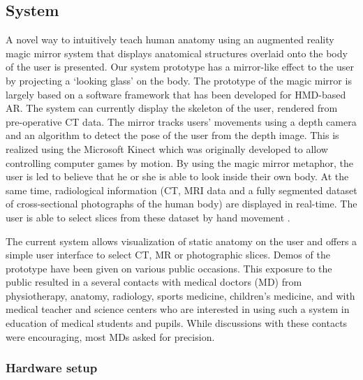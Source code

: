 \subsection{System}
A novel way to intuitively teach human anatomy using an augmented reality magic mirror system that displays anatomical structures overlaid onto the body of the user is presented. 
Our system prototype has a mirror-like effect to the user by projecting a ‘looking glass’ on the body. The prototype of the magic mirror is largely based on a software framework that has been developed for HMD-based AR. The system can currently display the skeleton of the user, rendered from pre-operative CT data. The mirror tracks users’ movements using a depth camera and an algorithm to detect the pose of the user from the depth image. This is realized using the Microsoft Kinect which was originally developed to allow controlling computer games by motion. By using the magic mirror metaphor, the user is led to believe that he or she is able to look inside their own body. At the same time, radiological information (CT, MRI data and a fully segmented dataset of cross-sectional photographs of the human body) are displayed in real-time. The user is able to select slices from these dataset by hand movement \cite{Blum2012,Navab2012a}.

The current system allows visualization of static anatomy on the user and offers a simple user interface to select CT, MR or photographic slices. Demos of the prototype have been given on various public occasions. This exposure to the public resulted in a several contacts with medical doctors (MD) from physiotherapy, anatomy, radiology, sports medicine, children’s medicine, and with medical teacher and science centers who are interested in using such a system in education of medical students and pupils. While discussions with these contacts were encouraging, most MDs asked for precision.
\subsubsection{Hardware setup}
